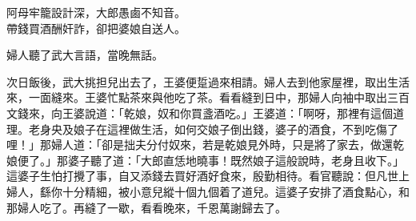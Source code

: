 \begin{myquote} 
阿母牢籠設計深，大郎愚鹵不知音。\\帶錢買酒酬奸詐，卻把婆娘自送人。{}
\end{myquote} 

婦人聽了武大言語，當晚無話。

次日飯後，武大挑担兒出去了，王婆便踅過來相請。婦人去到他家屋裡，取出生活來，一面縫來。王婆忙點茶來與他吃了茶。看看縫到日中，那婦人向袖中取出三百文錢來，向王婆說道：「乾娘，奴和你買盞酒吃。」王婆道：「啊呀，那裡有這個道理。老身央及娘子在這裡做生活，如何交娘子倒出錢，婆子的酒食，不到吃傷了哩！」{}那婦人道：「卻是拙夫分付奴來，若是乾娘見外時，只是將了家去，做還乾娘便了。」那婆子聽了道：「大郎直恁地曉事！既然娘子這般說時，老身且收下。」這婆子生怕打攪了事，自又添錢去買好酒好食來，殷勤相待。看官聽說：但凡世上婦人，繇你十分精細，被小意兒縱十個九個着了道兒。這婆子安排了酒食點心，和那婦人吃了。再縫了一歇，看看晚來，千恩萬謝歸去了。

